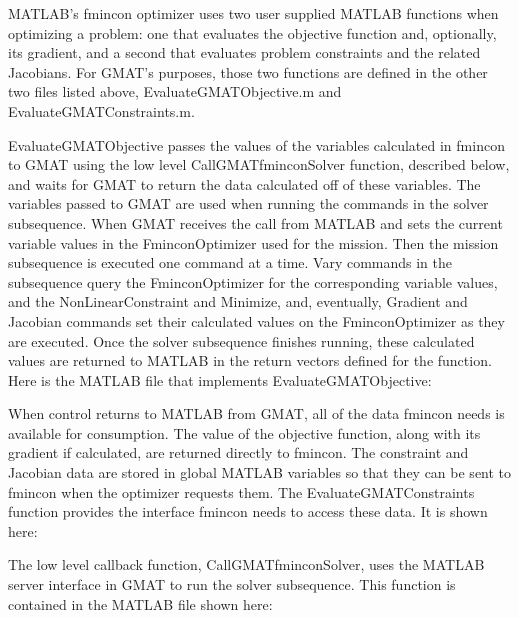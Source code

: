 \begin{quote}
\end{quote}

\noindent MATLAB's fmincon optimizer uses two user supplied MATLAB functions when optimizing a
problem: one that evaluates the objective function and, optionally, its gradient, and a second that
evaluates problem constraints and the related Jacobians.  For GMAT's purposes, those two functions
are defined in the other two files listed above, EvaluateGMATObjective.m and
EvaluateGMATConstraints.m.

EvaluateGMATObjective passes the values of the variables calculated in fmincon to GMAT using the low
level CallGMATfminconSolver function, described below, and waits for GMAT to return the data
calculated off of these variables.  The variables passed to GMAT are used when running the commands
in the solver subsequence.  When GMAT receives the call from MATLAB and sets the current variable
values in the FminconOptimizer used for the mission.  Then the mission subsequence is executed one
command at a time.  Vary commands in the subsequence query the FminconOptimizer for the
corresponding variable values, and the NonLinearConstraint and Minimize, and, eventually, Gradient
and Jacobian commands set their calculated values on the FminconOptimizer as they are executed.
Once the solver subsequence finishes running, these calculated values are returned to MATLAB in the
return vectors defined for the function.  Here is the MATLAB file that implements
EvaluateGMATObjective:

\begin{quote}
\end{quote}

\noindent When control returns to MATLAB from GMAT, all of the data fmincon needs is available for
consumption.  The value of the objective function, along with its gradient if calculated, are
returned directly to fmincon.  The constraint and Jacobian data are stored in global MATLAB
variables so that they can be sent to fmincon when the optimizer requests them.  The
EvaluateGMATConstraints function provides the interface fmincon needs to access these data.  It is
shown here:

\begin{quote}
\end{quote}

The low level callback function, CallGMATfminconSolver, uses the MATLAB server interface in GMAT to
run the solver subsequence.  This function is contained in the MATLAB file shown here:

